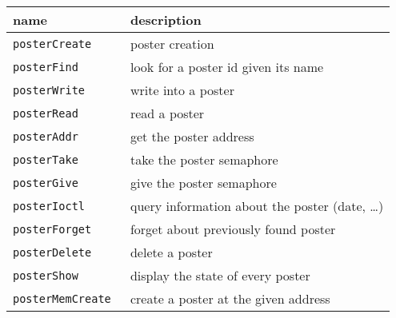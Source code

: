 \begin{center}\small\begin{tabularx}{\linewidth}{|l|X|}
\hline
name		& description \\
\hline
\tt posterCreate & poster creation \\
\tt posterFind	& look for a poster id given its name\\
\tt posterWrite	& write into a poster \\
\tt posterRead  & read a poster \\
\tt posterAddr  & get the poster address \\
\tt posterTake	& take the poster semaphore  \\
\tt posterGive	& give the poster semaphore \\
\tt posterIoctl & query information about the poster (date, \ldots) \\
\tt posterForget & forget about previously found poster \\
\tt posterDelete & delete a poster \\
\tt posterShow & display the state of every poster \\
\tt posterMemCreate & create a poster at the given address \\
\hline
\end{tabularx}\end{center}


